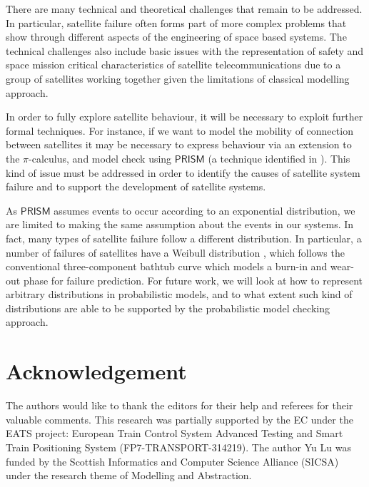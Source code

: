 \documentclass[preprint,12pt]{qrei}
\begin{document}
There are many technical and theoretical challenges that remain to be addressed. In particular, satellite failure often forms part of more complex problems that show through different aspects of the engineering of space based systems. The technical challenges also include basic issues with the representation of safety and space mission critical characteristics of satellite telecommunications due to a group of satellites working together given the limitations of classical modelling approach.

In order to fully explore satellite behaviour, it will be necessary to exploit further formal techniques. For instance, if we want to model the mobility of connection between satellites it may be necessary to express behaviour via an extension to the $\pi$-calculus, and model check using $\mathsf{PRISM}$ (a technique identified in \cite{NPP+09}). This kind of issue must be addressed in order to identify the causes of satellite system failure and to support the development of satellite systems.

As $\mathsf{PRISM}$ assumes events to occur according to an exponential distribution, we are limited to making the same assumption about the events in our systems. In fact, many types of satellite failure follow a different distribution. In particular, a number of failures of satellites have a Weibull distribution \cite{Bir10}, which follows the conventional three-component bathtub curve which models a burn-in and wear-out phase for failure prediction. For future work, we will look at how to represent arbitrary distributions in probabilistic models, and to what extent such kind of distributions are able to be supported by the probabilistic model checking approach.



\section*{Acknowledgement}

The authors would like to thank the editors for their help and referees for their valuable comments. This research was partially supported by the EC under the EATS project: European Train Control System Advanced Testing and Smart Train Positioning System (FP7-TRANSPORT-314219). The author Yu Lu was funded by the Scottish Informatics and Computer Science Alliance (SICSA) under the research theme of Modelling and Abstraction.




\end{document}

